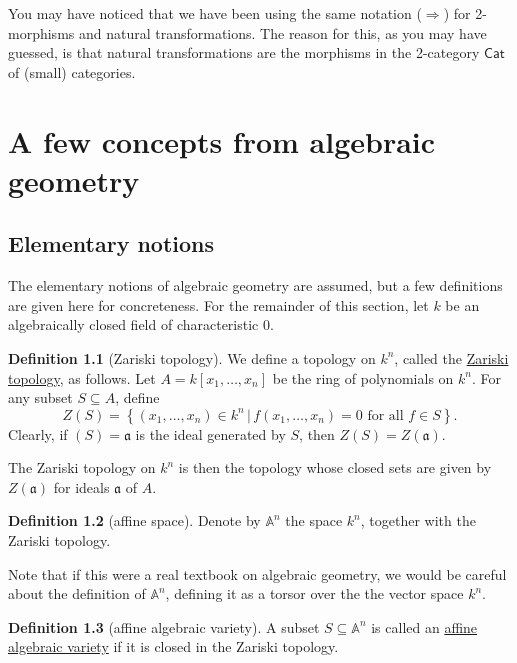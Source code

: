 \documentclass[a4paper,10pt]{scrreprt}
\newcommand{\defn}[1]{\ul{#1}}
\theoremstyle{definition}
\newtheorem{definition}{Definition}[section]
\theoremstyle{plain}
\theoremstyle{remark}
\begin{document}
You may have noticed that we have been using the same notation ($\Rightarrow$) for 2-morphisms and natural transformations. The reason for this, as you may have guessed, is that natural transformations are the morphisms in the 2-category $\mathsf{Cat}$ of (small) categories.

\chapter{A few concepts from algebraic geometry}
\section{Elementary notions}
The elementary notions of algebraic geometry are assumed, but a few definitions are given here for concreteness. For the remainder of this section, let $k$ be an algebraically closed field of characteristic $0$.
\begin{definition}[Zariski topology]
  \label{def:zariskitopology}
  We define a topology on $k^{n}$, called the \defn{Zariski topology}, as follows. Let $A = k[x_{1},\dots,x_{n}]$ be the ring of polynomials on $k^{n}$. For any subset $S \subseteq A$, define
  \begin{equation*}
    Z(S) = \left\{ (x_{1},\dots,x_{n}) \in k^{n}\,\Big|\, f(x_{1},\dots,x_{n}) = 0\text{ for all }f \in S \right\}.
  \end{equation*}
  Clearly, if $(S) = \mathfrak{a}$ is the ideal generated by $S$, then $Z(S) = Z(\mathfrak{a})$.

  The Zariski topology on $k^{n}$ is then the topology whose closed sets are given by $Z(\mathfrak{a})$ for ideals $\mathfrak{a}$ of $A$.
\end{definition}

\begin{definition}[affine space]
  \label{def:affinespace}
  Denote by $\mathbb{A}^{n}$ the space $k^{n}$, together with the Zariski topology. 

  Note that if this were a real textbook on algebraic geometry, we would be careful about the definition of $\mathbb{A}^{n}$, defining it as a torsor over the the vector space $k^{n}$.
\end{definition} 

\begin{definition}[affine algebraic variety]
  \label{def:algebraicvariety}
  A subset $S \subseteq \mathbb{A}^{n}$ is called an \defn{affine algebraic variety} if it is closed in the Zariski topology.
\end{definition}
\end{document}
